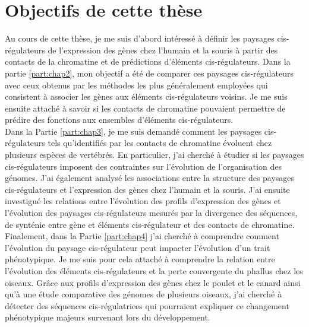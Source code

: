 \chapter{Objectifs de cette thèse}
\label{chap:objectifs}

Au cours de cette thèse, je me suis d’abord intéressé à définir les paysages \gls{cis}-régulateurs de l’expression des gènes chez l’humain et la souris à partir des contacts de la chromatine et de prédictions d’éléments \gls{cis}-régulateurs. Dans la partie \ref{part:chap2}, mon objectif a été de comparer ces paysages \gls{cis}-régulateurs avec ceux obtenus par les méthodes les plus généralement employées qui consistent à associer les gènes aux éléments \gls{cis}-régulateurs voisins. Je me suis ensuite attaché à savoir si les contacts de chromatine pouvaient permettre de prédire des fonctions aux ensembles d'éléments \gls{cis}-régulateurs.\\

Dans la Partie \ref{part:chap3}, je me suis demandé comment les paysages \gls{cis}-régulateurs tels qu'identifiés par les contacts de chromatine évoluent chez plusieurs espèces de vertébrés. En particulier, j’ai cherché à étudier si les paysages \gls{cis}-régulateurs imposent des contraintes sur l’évolution de l’organisation des génomes. J’ai également analysé les associations entre la structure des paysages \gls{cis}-régulateurs et l’expression des gènes chez l’humain et la souris. J’ai ensuite investigué les relations entre l’évolution des profils d’expression des gènes et l’évolution des paysages \gls{cis}-régulateurs mesurés par la divergence des séquences, de synténie entre gène et éléments \gls{cis}-régulateur et des contacts de chromatine.\\

Finalement, dans la Partie \ref{part:chap4} j’ai cherché à comprendre comment l’évolution du paysage \gls{cis}-régulateur peut impacter l’évolution d’un trait phénotypique. Je me suis pour cela attaché à comprendre la relation entre l’évolution des éléments \gls{cis}-régulateurs et la perte convergente du phallus chez les oiseaux. Grâce aux profils d’expression des gènes chez le poulet et le canard ainsi qu’à une étude comparative des génomes de plusieurs oiseaux, j’ai cherché à détecter des séquences \gls{cis}-régulatrices qui pourraient expliquer ce changement phénotypique majeurs survenant lors du développement.